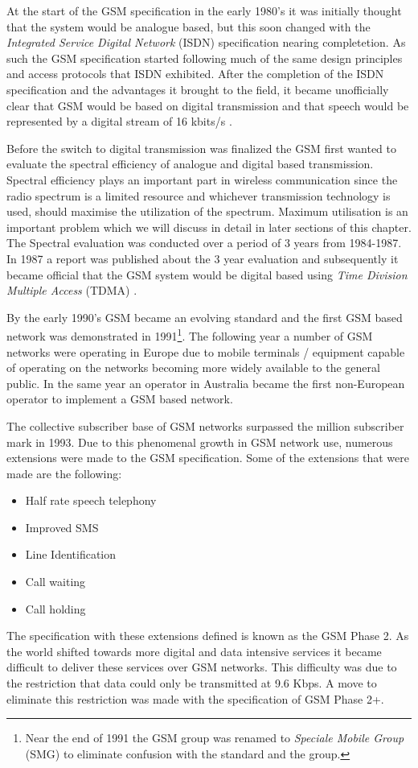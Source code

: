 At the start of the GSM specification in the early 1980's it was initially thought that the system would be analogue based, but this soon changed with the \emph{Integrated Service Digital Network} (ISDN) specification nearing completetion. As such the GSM specification started following much of the same design principles and access protocols that ISDN exhibited. After the completion of the ISDN specification and the advantages it brought to the field, it became unofficially clear that GSM would be based on digital transmission and that speech would be represented by a digital stream of 16 kbits/s \cite{GSM92}.

Before the switch to digital transmission was finalized the GSM first wanted to evaluate the spectral efficiency of analogue and digital based transmission. Spectral efficiency plays an important part in wireless communication since the radio spectrum is a limited resource and whichever transmission technology is used, should maximise the utilization of the spectrum. Maximum utilisation is an important problem which we will discuss in detail in later sections of this chapter. The Spectral evaluation was conducted over a period of 3 years from 1984-1987. In 1987 a report was published about the 3 year evaluation and subsequently it became official that the GSM system would be digital based using \emph{Time Division Multiple Access} (TDMA) \cite{GSM92,GSMSysEngin}.

By the early 1990’s GSM became an evolving standard and the first GSM based network was demonstrated in 1991\footnote{Near the end of 1991 the GSM group was renamed to \emph{Speciale Mobile Group} (SMG) to eliminate confusion with the standard and the group.}. The following year a number of GSM networks were operating in Europe due to mobile terminals / equipment capable of operating on the networks becoming more widely available to the general public. In the same year an operator in Australia became the first non-European operator to implement a GSM based network\cite{Eisenblatter}.

The collective subscriber base of GSM networks surpassed the million subscriber mark in 1993. Due to this phenomenal growth in GSM network use, numerous extensions were made to the GSM specification. 
Some of the extensions that were made are the following\cite{Eisenblatter}:
\begin{itemize}
\item Half rate speech telephony
\item Improved SMS
\item Line Identification
\item Call waiting
\item Call holding
\end{itemize}
The specification with these extensions defined is known as the GSM Phase 2. As the world shifted towards more digital and data intensive services it became difficult to deliver these services over GSM 
networks. This difficulty was due to the restriction that data could only be transmitted at 9.6 Kbps. A move to eliminate this restriction was made with the specification of GSM Phase 2+. 

